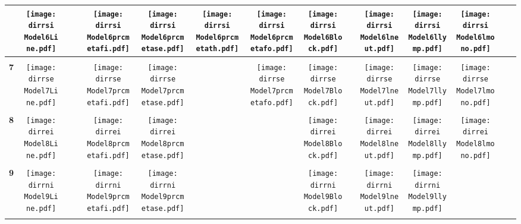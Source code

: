 \documentclass[landscape]{article}
\def \dirrsi{U:/R/RA/Data/RFI-newdata/resultsingle/Model6.Line.prcmetafi.prcmetase.prcmetath.prcmetafo.lneut.llymp.lmono.Block/}
\def \dirrse{U:/R/RA/Data/RFI-newdata/resultsingle/Model7.Line.prcmetafi.prcmetase.prcmetafo.lneut.llymp.lmono.Block/}
\def \dirrei{U:/R/RA/Data/RFI-newdata/resultsingle/Model8.Line.prcmetafi.prcmetase.lneut.llymp.lmono.Block/}
\def \dirrni{U:/R/RA/Data/RFI-newdata/resultsingle/Model9.Line.prcmetafi.prcmetase.lneut.llymp.Block/}
\begin{document}
\begin{table}
\begin{tabular}{ccccccccccccccc}
     &\texttt{[image: \\dirrsi Model6Line.pdf]}
      &
      &
      &\texttt{[image: \\dirrsi Model6prcmetafi.pdf]}
      &\texttt{[image: \\dirrsi Model6prcmetase.pdf]}
      &\texttt{[image: \\dirrsi Model6prcmetath.pdf]}
      &\texttt{[image: \\dirrsi Model6prcmetafo.pdf]}
      &\texttt{[image: \\dirrsi Model6Block.pdf]}
      &
      &\texttt{[image: \\dirrsi Model6lneut.pdf]}
      &\texttt{[image: \\dirrsi Model6llymp.pdf]}
      &\texttt{[image: \\dirrsi Model6lmono.pdf]}
      &
      &
     \\[3.5pt]
     \hline
     \\[3.5pt]
     {\Huge \textbf{7}} 
       &\texttt{[image: \\dirrse Model7Line.pdf]}
      &
      &
      &\texttt{[image: \\dirrse Model7prcmetafi.pdf]}
      &\texttt{[image: \\dirrse Model7prcmetase.pdf]}
      &
      &\texttt{[image: \\dirrse Model7prcmetafo.pdf]}
      &\texttt{[image: \\dirrse Model7Block.pdf]}
      &
      &\texttt{[image: \\dirrse Model7lneut.pdf]}
      &\texttt{[image: \\dirrse Model7llymp.pdf]}
      &\texttt{[image: \\dirrse Model7lmono.pdf]}
      &
      &
     \\[3.5pt]
     \hline
     \\[3.5pt]
     {\Huge \textbf{8}} 
       &\texttt{[image: \\dirrei Model8Line.pdf]}
      &
      &
      &\texttt{[image: \\dirrei Model8prcmetafi.pdf]}
      &\texttt{[image: \\dirrei Model8prcmetase.pdf]}
      &
      &
      &\texttt{[image: \\dirrei Model8Block.pdf]}
      &
      &\texttt{[image: \\dirrei Model8lneut.pdf]}
      &\texttt{[image: \\dirrei Model8llymp.pdf]}
      &\texttt{[image: \\dirrei Model8lmono.pdf]}
      &
      &
     \\[3.5pt]
     \hline
     \\[3.5pt]
{\Huge \textbf{9}} 
       &\texttt{[image: \\dirrni Model9Line.pdf]}
      &
      &
      &\texttt{[image: \\dirrni Model9prcmetafi.pdf]}
      &\texttt{[image: \\dirrni Model9prcmetase.pdf]}
      &
      &
      &\texttt{[image: \\dirrni Model9Block.pdf]}
      &
      &\texttt{[image: \\dirrni Model9lneut.pdf]}
      &\texttt{[image: \\dirrni Model9llymp.pdf]}
      &
      &
      &
     \\[3.5pt]
     \hline
     \\[3.5pt]

\end{tabular}
\end{table}
\end{document}
